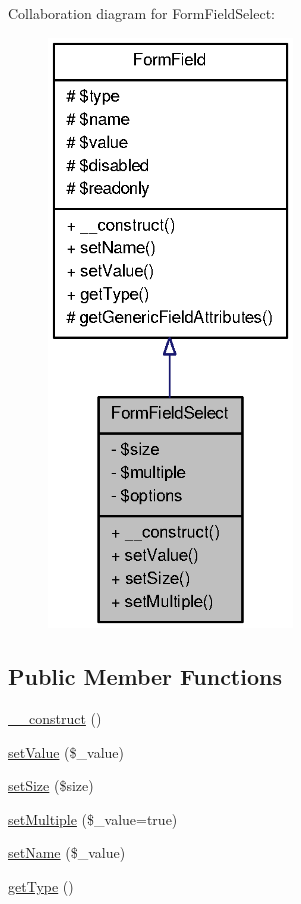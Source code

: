Collaboration diagram for FormFieldSelect:\nopagebreak
\begin{figure}[H]
\begin{center}
\leavevmode
\includegraphics[width=184pt]{classFormFieldSelect__coll__graph}
\end{center}
\end{figure}
\subsection*{Public Member Functions}
\begin{DoxyCompactItemize}
\item 
\hyperlink{classFormFieldSelect_a32c59192be8c316fb2f7e1edde8f0a98}{\_\-\_\-construct} ()
\item 
\hyperlink{classFormFieldSelect_ae69f5b352df63796c048dca6a2de7544}{setValue} (\$\_\-value)
\item 
\hyperlink{classFormFieldSelect_ad8ae8dcf6f6763cb32966eeca33c472b}{setSize} (\$size)
\item 
\hyperlink{classFormFieldSelect_aa69374c1f0692d691e7899f3ed14a42e}{setMultiple} (\$\_\-value=true)
\item 
\hyperlink{classFormField_ad57e32bd53170af060e869b3b60f0ef7}{setName} (\$\_\-value)
\item 
\hyperlink{classFormField_a1f64b737bccb6b2827f8c5665b9920c7}{getType} ()
\end{DoxyCompactItemize}
